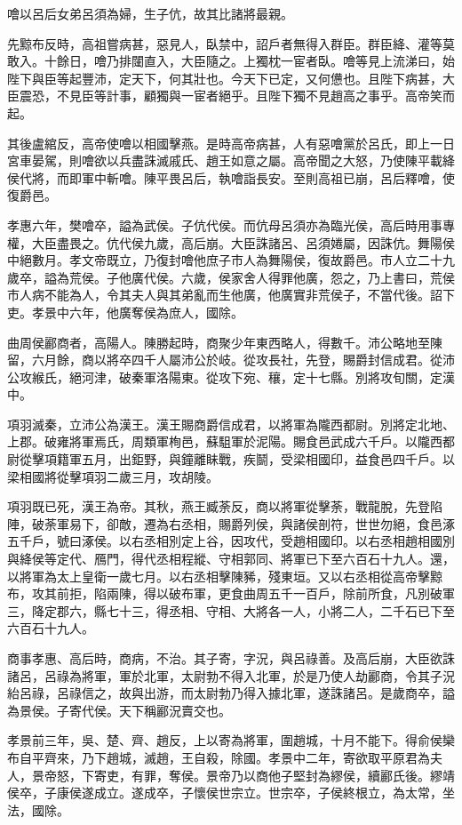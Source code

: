 噲以呂后女弟呂須為婦，生子伉，故其比諸將最親。

先黥布反時，高祖嘗病甚，惡見人，臥禁中，詔戶者無得入群臣。群臣絳、灌等莫敢入。十餘日，噲乃排闥直入，大臣隨之。上獨枕一宦者臥。噲等見上流涕曰，始陛下與臣等起豐沛，定天下，何其壯也。今天下已定，又何憊也。且陛下病甚，大臣震恐，不見臣等計事，顧獨與一宦者絕乎。且陛下獨不見趙高之事乎。高帝笑而起。

其後盧綰反，高帝使噲以相國擊燕。是時高帝病甚，人有惡噲黨於呂氏，即上一日宮車晏駕，則噲欲以兵盡誅滅戚氏、趙王如意之屬。高帝聞之大怒，乃使陳平載絳侯代將，而即軍中斬噲。陳平畏呂后，執噲詣長安。至則高祖已崩，呂后釋噲，使復爵邑。

孝惠六年，樊噲卒，謚為武侯。子伉代侯。而伉母呂須亦為臨光侯，高后時用事專權，大臣盡畏之。伉代侯九歲，高后崩。大臣誅諸呂、呂須婘屬，因誅伉。舞陽侯中絕數月。孝文帝既立，乃復封噲他庶子市人為舞陽侯，復故爵邑。市人立二十九歲卒，謚為荒侯。子他廣代侯。六歲，侯家舍人得罪他廣，怨之，乃上書曰，荒侯市人病不能為人，令其夫人與其弟亂而生他廣，他廣實非荒侯子，不當代後。詔下吏。孝景中六年，他廣奪侯為庶人，國除。

曲周侯酈商者，高陽人。陳勝起時，商聚少年東西略人，得數千。沛公略地至陳留，六月餘，商以將卒四千人屬沛公於岐。從攻長社，先登，賜爵封信成君。從沛公攻緱氏，絕河津，破秦軍洛陽東。從攻下宛、穰，定十七縣。別將攻旬關，定漢中。

項羽滅秦，立沛公為漢王。漢王賜商爵信成君，以將軍為隴西都尉。別將定北地、上郡。破雍將軍焉氏，周類軍栒邑，蘇駔軍於泥陽。賜食邑武成六千戶。以隴西都尉從擊項籍軍五月，出鉅野，與鐘離眛戰，疾鬬，受梁相國印，益食邑四千戶。以梁相國將從擊項羽二歲三月，攻胡陵。

項羽既已死，漢王為帝。其秋，燕王臧荼反，商以將軍從擊荼，戰龍脫，先登陷陣，破荼軍易下，卻敵，遷為右丞相，賜爵列侯，與諸侯剖符，世世勿絕，食邑涿五千戶，號曰涿侯。以右丞相別定上谷，因攻代，受趙相國印。以右丞相趙相國別與絳侯等定代、鴈門，得代丞相程縱、守相郭同、將軍已下至六百石十九人。還，以將軍為太上皇衛一歲七月。以右丞相擊陳豨，殘東垣。又以右丞相從高帝擊黥布，攻其前拒，陷兩陳，得以破布軍，更食曲周五千一百戶，除前所食，凡別破軍三，降定郡六，縣七十三，得丞相、守相、大將各一人，小將二人，二千石已下至六百石十九人。

商事孝惠、高后時，商病，不治。其子寄，字況，與呂祿善。及高后崩，大臣欲誅諸呂，呂祿為將軍，軍於北軍，太尉勃不得入北軍，於是乃使人劫酈商，令其子況紿呂祿，呂祿信之，故與出游，而太尉勃乃得入據北軍，遂誅諸呂。是歲商卒，謚為景侯。子寄代侯。天下稱酈況賣交也。

孝景前三年，吳、楚、齊、趙反，上以寄為將軍，圍趙城，十月不能下。得俞侯欒布自平齊來，乃下趙城，滅趙，王自殺，除國。孝景中二年，寄欲取平原君為夫人，景帝怒，下寄吏，有罪，奪侯。景帝乃以商他子堅封為繆侯，續酈氏後。繆靖侯卒，子康侯遂成立。遂成卒，子懷侯世宗立。世宗卒，子侯終根立，為太常，坐法，國除。

